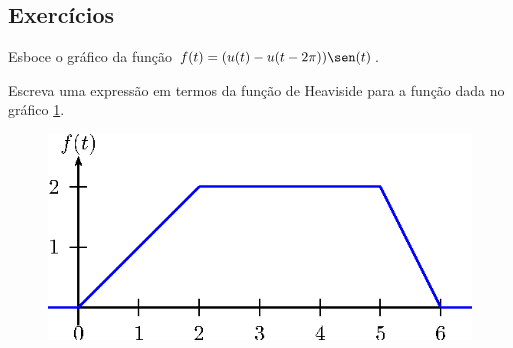 \subsection*{Exercícios}
\begin{exer}Esboce o gráfico da função $f(t)=(u(t)-u(t-2\pi))\sen(t)$.
\end{exer}
\begin{exer}Escreva uma expressão em termos da função de Heaviside para a função dada no gráfico \ref{fig_Heaviside_prob}.
 \begin{figure}[!ht]
\begin{center}

\includegraphics{cap_trans_int/pics/figura_9}\end{center}
\caption{\label{fig_Heaviside_prob}}
\end{figure} 
\end{exer}

